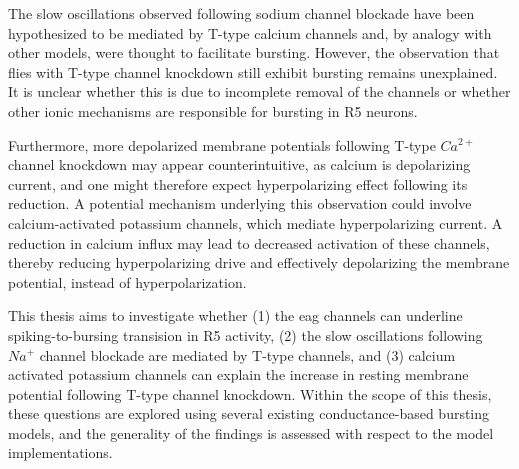 \documentclass[../main.tex]{subfiles}
\begin{document}
The slow oscillations observed following sodium channel blockade have been hypothesized to be mediated by T-type calcium channels and, by analogy with other models, were thought to facilitate bursting. However, the observation that flies with T-type channel knockdown still exhibit bursting remains unexplained. It is unclear whether this is due to incomplete removal of the channels or whether other ionic mechanisms are responsible for bursting in R5 neurons.

Furthermore, more depolarized membrane potentials following T-type $Ca^{2+}$ channel knockdown may appear counterintuitive, as calcium is depolarizing current, and one might therefore expect hyperpolarizing effect following its reduction. A potential mechanism underlying this observation could involve calcium-activated potassium channels, which mediate hyperpolarizing current. A reduction in calcium influx may lead to decreased activation of these channels, thereby reducing hyperpolarizing drive and effectively depolarizing the membrane potential, instead of hyperpolarization.

This thesis aims to investigate whether (1) the \gls{eag} channels can underline spiking-to-bursing transision in R5 activity, (2) the slow oscillations following $Na^+$ channel blockade are mediated by T-type channels, and (3) calcium activated potassium channels can explain the increase in resting membrane potential following T-type channel knockdown. Within the scope of this thesis, these questions are explored using several existing conductance-based bursting models, and the generality of the findings is assessed with respect to the model implementations.



\end{document}
